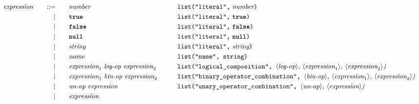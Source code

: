 \begin{alignat*}{9}
  && \textit{expression}
                         &&\quad  ::= &\quad && \textit{number}  && \texttt{list("literal",}\ \textit{number}\texttt{)} \\
&&                       && |   &\quad && \textbf{\texttt{true}}
                                                           && \texttt{list("literal",}\ \textbf{\texttt{true}}\texttt{)} \\
&&                       && |   &\quad && \textbf{\texttt{false}}
                                                           && \texttt{list("literal",}\ \textbf{\texttt{false}}\texttt{)} \\
&&                       && |   &\quad && \textbf{\texttt{null}}
                                                           && \texttt{list("literal",}\ \textbf{\texttt{null}}\texttt{)} \\
&&                       && |   &\quad &&  \textit{string}
                                                           && \texttt{list("literal",}\ \textit{string}\texttt{)} \\
&&                       && |   &\quad &&  \textit{name}   && \texttt{list("name", string)}  \\
&&                       && |   &\quad &&  \textit{expression}_1 \  \textit{log-op} \
                                            \textit{expression}_2 \qquad
                                                           && \texttt{list("logical\_composition",  } \langle \textit{log-op}\rangle \textit{, } \langle \textit{expression}_1\rangle \textit{, } \langle \textit{expression}_2\rangle \textit{)} \\
&&                       && |   &\quad &&  \textit{expression}_1 \  \textit{bin-op} \
                                            \textit{expression}_2 \qquad
                                                           && \texttt{list("binary\_operator\_combination",  } \langle \textit{bin-op}\rangle \textit{, } \langle \textit{expression}_1\rangle \textit{, } \langle \textit{expression}_2\rangle \textit{)} \\
&&                       && |   &\quad &&   \textit{un-op} \
                                            \textit{expression}
                                                           && \texttt{list("unary\_operator\_combination",  } \langle \textit{un-op}\rangle \textit{, } \langle \textit{expression}\rangle \textit{)} \\
&&                       && |   &\quad &&   \textit{expression} \

\end{alignat*}
